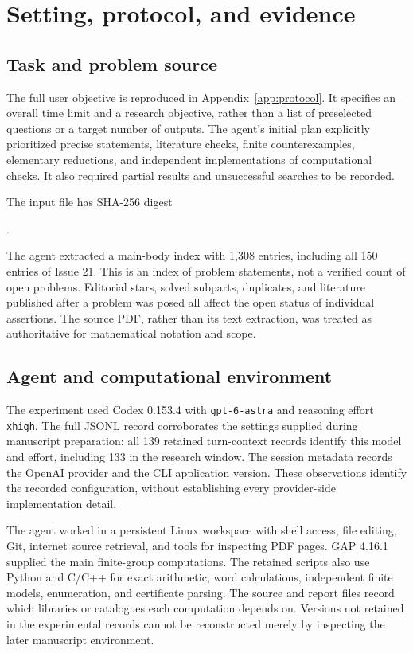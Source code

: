 \section{Setting, protocol, and evidence}
\label{sec:methods}

\subsection{Task and problem source}

The full user objective is reproduced in Appendix~\ref{app:protocol}.
It specifies an overall time limit and a research objective, rather
than a list of preselected questions or a target number of outputs.
The agent's initial plan explicitly prioritized precise statements,
literature checks, finite counterexamples, elementary reductions, and
independent implementations of computational checks. It also required
partial results and unsuccessful searches to be recorded.

The input file  has SHA-256 digest
\begin{center}
\small{}.
\end{center}
The agent extracted a main-body index with 1,308 entries, including
all 150 entries of Issue 21. This is an index of problem statements,
not a verified count of open problems. Editorial stars, solved
subparts, duplicates, and literature published after a problem was
posed all affect the open status of individual assertions.
The source PDF, rather than its text extraction, was treated as
authoritative for mathematical notation and scope.

\subsection{Agent and computational environment}

The experiment used Codex 0.153.4 with \texttt{gpt-6-astra} and
reasoning effort \texttt{xhigh}. The full JSONL record corroborates the
settings supplied during manuscript preparation: all 139 retained
turn-context records identify this model and effort, including 133 in
the research window. The session metadata records the OpenAI provider
and the CLI application version. These observations identify the
recorded configuration, without establishing every provider-side
implementation detail.

The agent worked in a persistent Linux workspace with shell access,
file editing, Git, internet source retrieval, and tools for inspecting
PDF pages. GAP 4.16.1 supplied the main finite-group computations.
The retained scripts also use Python and C/C++ for exact arithmetic,
word calculations, independent finite models, enumeration, and
certificate parsing. The source and report files record which
libraries or catalogues each computation depends on. Versions not
retained in the experimental records cannot be reconstructed merely
by inspecting the later manuscript environment.

